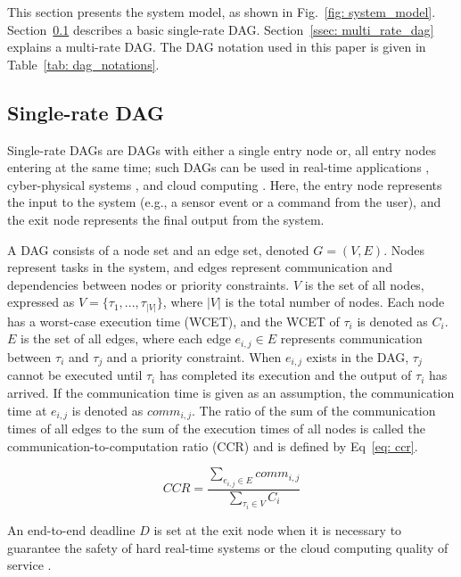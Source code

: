 This section presents the system model, as shown in Fig.~\ref{fig: system_model}.
Section~\ref{ssec: single_rate_dag} describes a basic single-rate DAG.
Section~\ref{ssec: multi_rate_dag} explains a multi-rate DAG.
The DAG notation used in this paper is given in Table~\ref{tab: dag_notations}.


\subsection{Single-rate DAG}
\label{ssec: single_rate_dag}

Single-rate DAGs are DAGs with either a single entry node or, all entry nodes entering at the same time; such DAGs can be used in real-time applications \cite{zhao2020dag}, cyber-physical systems \cite{senapati2021hmds}, and cloud computing \cite{kaur2020deep}.
Here, the entry node represents the input to the system (e.g., a sensor event or a command from the user), and the exit node represents the final output from the system.

A DAG consists of a node set and an edge set, denoted $G = (V, E)$.
Nodes represent tasks in the system, and edges represent communication and dependencies between nodes or priority constraints.
$V$ is the set of all nodes, expressed as $V = \{\tau_1, ..., \tau_{|V|}\}$, where $|V|$ is the total number of nodes.
Each node has a worst-case execution time (WCET), and the WCET of $\tau_i$ is denoted as $C_i$.
$E$ is the set of all edges, where each edge $e_{i,j} \in E$ represents communication between $\tau_i$ and $\tau_j$ and a priority constraint.
When $e_{i,j}$ exists in the DAG, $\tau_j$ cannot be executed until $\tau_i$ has completed its execution and the output of $\tau_i$ has arrived.
If the communication time is given as an assumption, the communication time at $e_{i,j}$ is denoted as $comm_{i, j}$.
The ratio of the sum of the communication times of all edges to the sum of the execution times of all nodes is called the communication-to-computation ratio (CCR) and is defined by Eq~\ref{eq: ccr}.

\begin{equation}
    \label{eq: ccr}
    CCR = \frac{\sum\limits_{e_{i,j} \in E}comm_{i, j}}{\sum\limits_{\tau_i \in V}C_i}
\end{equation}

An end-to-end deadline $D$ is set at the exit node when it is necessary to guarantee the safety of hard real-time systems \cite{yano2021work} or the cloud computing quality of service \cite{zhang2020efficient}.


